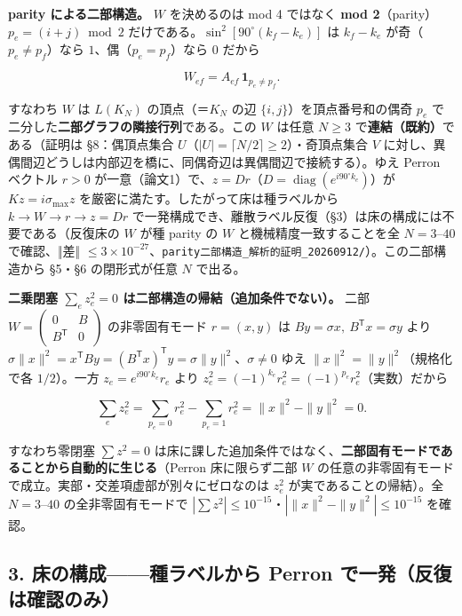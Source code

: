 \documentclass[
  a4paper,
]{ltjsarticle}
\begin{document}
\textbf{parity による二部構造。} \(W\) を決めるのは mod 4 ではなく
\textbf{mod 2}（parity）\(p_e=(i+j)\bmod2\)
だけである。\(\sin^2[90^\circ(k_f-k_e)]\) は \(k_f-k_e\)
が奇（\(p_e\neq p_f\)）なら \(1\)、偶（\(p_e=p_f\)）なら \(0\) だから

\[W_{ef}=A_{ef}\,\mathbf 1_{p_e\neq p_f}.\]

すなわち \(W\) は \(L(K_N)\) の頂点（＝\(K_N\) の辺
\(\{i,j\}\)）を頂点番号和の偶奇 \(p_e\)
で二分した\textbf{二部グラフの隣接行列}である。この \(W\) は任意
\(N\ge3\) で\textbf{連結（既約）}である（証明は §8：偶頂点集合
\(U\)（\(|U|=\lceil N/2\rceil\ge2\)）・奇頂点集合 \(V\)
に対し、異偶間辺どうしは内部辺を橋に、同偶奇辺は異偶間辺で接続する）。ゆえ
Perron ベクトル \(r>0\)
が一意（論文1）で、\(z=Dr\)（\(D=\operatorname{diag}(e^{i90^\circ k_e})\)）が
\(Kz=i\sigma_{\max}z\) を厳密に満たす。したがって床は種ラベルから
\(k\to W\to r\to z=Dr\)
で一発構成でき、離散ラベル反復（§3）は床の構成には不要である（反復床の
\(W\) が種 parity の \(W\) と機械精度一致することを全 \(N=3\)--\(40\)
で確認、‖差‖
\(\le3\times10^{-27}\)、\texttt{parity二部構造\_解析的証明\_20260912/}）。この二部構造から
§5・§6 の閉形式が任意 \(N\) で出る。

\textbf{二乗閉塞 \(\sum_e z_e^2=0\)
は二部構造の帰結（追加条件でない）。} 二部
\(W=\begin{pmatrix}0&B\\B^{\mathsf T}&0\end{pmatrix}\) の非零固有モード
\(r=(x,y)\) は \(By=\sigma x,\ B^{\mathsf T}x=\sigma y\) より
\(\sigma\|x\|^2=x^{\mathsf T}By=(B^{\mathsf T}x)^{\mathsf T}y=\sigma\|y\|^2\)、\(\sigma\neq0\)
ゆえ \(\|x\|^2=\|y\|^2\)（規格化で各 \(1/2\)）。一方
\(z_e=e^{i90^\circ k_e}r_e\) より
\(z_e^2=(-1)^{k_e}r_e^2=(-1)^{p_e}r_e^2\)（実数）だから

\[\sum_e z_e^2=\sum_{p_e=0}r_e^2-\sum_{p_e=1}r_e^2=\|x\|^2-\|y\|^2=0.\]

すなわち零閉塞 \(\sum z^2=0\)
は床に課した追加条件ではなく、\textbf{二部固有モードであることから自動的に生じる}（Perron
床に限らず二部 \(W\)
の任意の非零固有モードで成立。実部・交差項虚部が別々にゼロなのは
\(z_e^2\) が実であることの帰結）。全 \(N=3\)--\(40\)
の全非零固有モードで
\(|\sum z^2|\le10^{-15}\)・\(|\|x\|^2-\|y\|^2|\le10^{-15}\) を確認。

\subsection{3. 床の構成------種ラベルから Perron
で一発（反復は確認のみ）}\label{ux5e8aux306eux69cbux6210ux7a2eux30e9ux30d9ux30ebux304bux3089-perron-ux3067ux4e00ux767aux53cdux5fa9ux306fux78baux8a8dux306eux307f}
\end{document}
